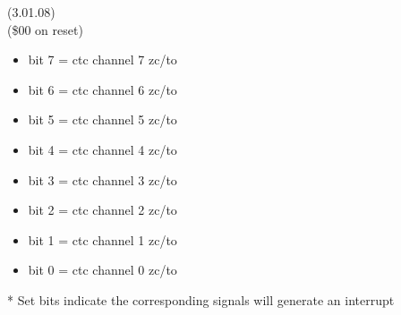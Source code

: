  (3.01.08)\\
(\$00 on reset)
\begin{itemize}
\item bit 7 = ctc channel 7 zc/to
\item bit 6 = ctc channel 6 zc/to
\item bit 5 = ctc channel 5 zc/to
\item bit 4 = ctc channel 4 zc/to
\item bit 3 = ctc channel 3 zc/to
\item bit 2 = ctc channel 2 zc/to
\item bit 1 = ctc channel 1 zc/to
\item bit 0 = ctc channel 0 zc/to
\end{itemize}
* Set bits indicate the corresponding signals will generate an interrupt

